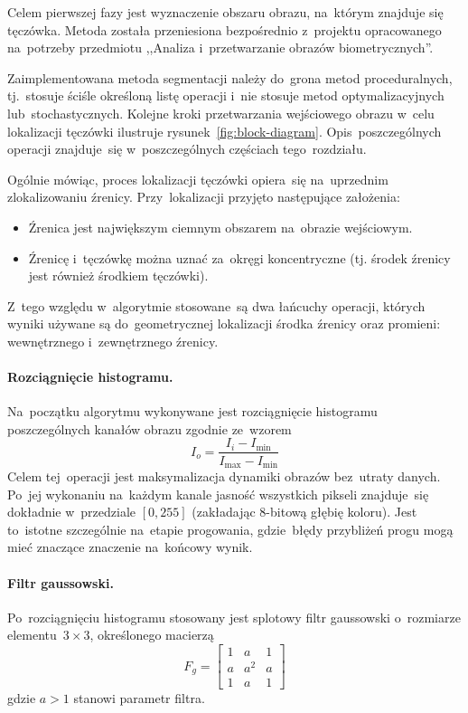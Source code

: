 \documentclass[11pt,a4paper]{article}
\begin{document}
Celem pierwszej fazy jest wyznaczenie obszaru obrazu, na~którym znajduje się tęczówka.
Metoda została przeniesiona bezpośrednio z~projektu opracowanego na~potrzeby przedmiotu ,,Analiza i~przetwarzanie obrazów biometrycznych''.

Zaimplementowana metoda segmentacji należy do~grona metod proceduralnych, tj.~stosuje ściśle określoną listę operacji i~nie stosuje metod optymalizacyjnych lub~stochastycznych.
Kolejne kroki przetwarzania wejściowego obrazu w~celu lokalizacji tęczówki ilustruje rysunek~\ref{fig:block-diagram}.
Opis~poszczególnych operacji znajduje~się w~poszczególnych częściach tego~rozdziału.

Ogólnie mówiąc, proces lokalizacji tęczówki opiera~się na~uprzednim zlokalizowaniu źrenicy.
Przy~lokalizacji przyjęto następujące założenia:
\begin{itemize}
    \item Źrenica jest największym ciemnym obszarem na~obrazie wejściowym.
    \item Źrenicę i~tęczówkę można uznać za~okręgi koncentryczne (tj. środek źrenicy jest również środkiem tęczówki).
\end{itemize}
Z~tego względu w~algorytmie stosowane~są dwa łańcuchy operacji, których wyniki używane są do~geometrycznej lokalizacji środka źrenicy oraz promieni: wewnętrznego i~zewnętrznego źrenicy.

\paragraph{Rozciągnięcie histogramu.}
Na~początku algorytmu wykonywane jest rozciągnięcie histogramu poszczególnych kanałów obrazu zgodnie ze~wzorem
$$ I_o = \frac{I_i - I_{\min}}{I_{\max} - I_{\min}} $$
Celem tej~operacji jest maksymalizacja dynamiki obrazów bez~utraty danych.
Po~jej wykonaniu na~każdym kanale jasność wszystkich pikseli znajduje~się dokładnie w~przedziale $[0, 255]$ (zakładając 8-bitową głębię koloru).
Jest to~istotne szczególnie na~etapie progowania, gdzie~błędy przybliżeń progu mogą mieć znaczące znaczenie na~końcowy wynik.

\paragraph{Filtr gaussowski.}
Po~rozciągnięciu histogramu stosowany jest splotowy filtr gaussowski o~rozmiarze elementu~$3 \times 3$, określonego macierzą
$$ F_g = \begin{bmatrix}
    1 & a & 1 \\
    a & a^2 & a \\
    1 & a & 1
\end{bmatrix} $$
gdzie $a > 1$ stanowi parametr filtra.
\end{document}
